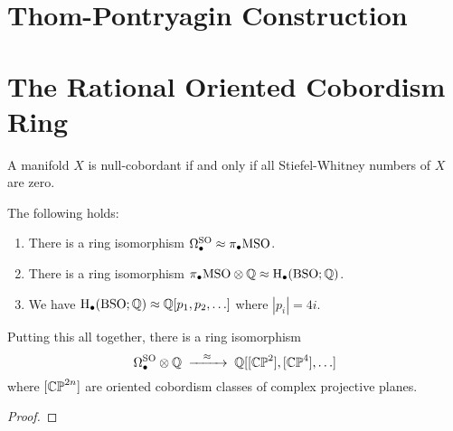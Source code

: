 \section{Thom-Pontryagin Construction}\label{sec:thom-pontryagin_construction}

\section{The Rational Oriented Cobordism Ring}

\begin{proposition}\label{prop:characteristic_numbers_cobordism_invariant}
\end{proposition}

\begin{theorem}\label{thm:vanishing_stiefel_whitney}
  A manifold $X$ is null-cobordant if and only if all Stiefel-Whitney numbers of $X$ are zero.
\end{theorem}

\begin{theorem}\label{thm:thom-pontryagin_oriented_cobordism}
  The following holds:
  \begin{enumerate}
    \item There is a ring isomorphism $\Omega^{\operatorname{SO}}_\bullet \approx \pi_\bullet {\operatorname{MSO}}$.
    \item There is a ring isomorphism $\pi_\bullet{\operatorname{MSO}} \otimes \mathbb{Q} \approx \operatorname{H}_\bullet({\operatorname{BSO}}; \mathbb{Q})$.
    \item We have $\operatorname{H}_\bullet({\operatorname{BSO}}; \mathbb{Q}) \approx \mathbb{Q}[p_1, p_2,\ldots]$ where $|p_i|=4i$.
  \end{enumerate}
  Putting this all together, there is a ring isomorphism
  \[
    \Omega^\SO_\bullet\otimes \Q \lkxto[\cong] \Q[[\CP^2], [\CP^4],\ldots]
  \]
  where $[\mathbb{CP}^{2n}]$ are oriented cobordism classes of complex projective planes.
\end{theorem}
\begin{proof}
\end{proof}
